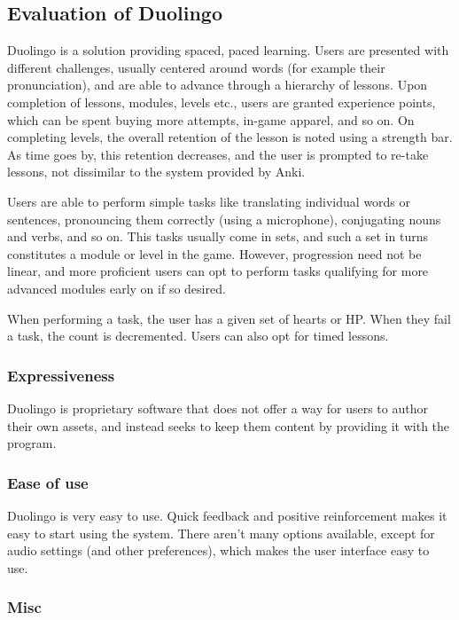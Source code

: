 \subsection{Evaluation of Duolingo}

Duolingo is a solution providing spaced, paced learning. Users are presented
with different challenges, usually centered around words (for example their
pronunciation), and are able to advance through a hierarchy of lessons. Upon
completion of lessons, modules, levels etc., users are granted experience 
points, which can be spent buying more attempts, in-game apparel, and so on. On
completing levels, the overall retention of the lesson is noted using a strength
bar. As time goes by, this retention decreases, and the user is prompted to
re-take lessons, not dissimilar to the system provided by Anki.

Users are able to perform simple tasks like translating individual words or
sentences, pronouncing them correctly (using a microphone), conjugating nouns
and verbs, and so on. This tasks usually come in sets, and such a set in turns
constitutes a module or level in the game. However, progression need not be
linear, and more proficient users can opt to perform tasks qualifying for more
advanced modules early on if so desired.

When performing a task, the user has a given set of hearts or HP. When they fail
a task, the count is decremented. Users can also opt for timed lessons.

\subsubsection{Expressiveness}

Duolingo is proprietary software that does not offer a way for users to author 
their own assets, and instead seeks to keep them content by providing it with 
the program.

\subsubsection{Ease of use}

Duolingo is very easy to use. Quick feedback and positive reinforcement makes 
it easy to start using the system. There aren't many options available, except 
for audio settings (and other preferences), which makes the user interface 
easy to use.

\subsubsection{Misc}

